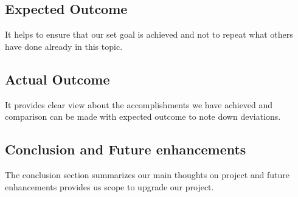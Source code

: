             \subsection{Expected Outcome}
                It helps to ensure that our set goal is achieved and not to repeat what others have done already in this topic. 
            \subsection{Actual Outcome}
                It provides clear view about the accomplishments we have achieved and comparison can be made with expected outcome to note down deviations.
            \subsection{Conclusion and Future enhancements}
                The conclusion section summarizes our main thoughts on project and future enhancements provides us scope to upgrade our project. 
            